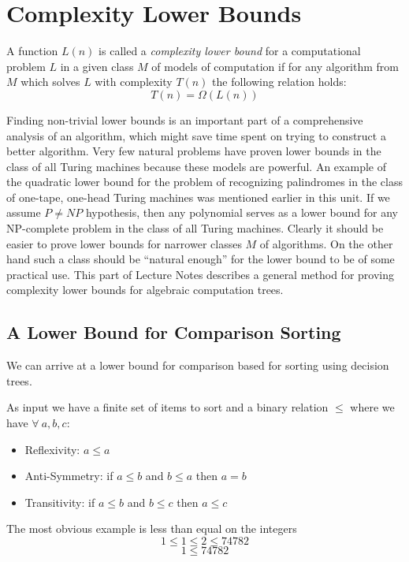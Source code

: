 \section{Complexity Lower Bounds}
\begin{definition}
    A function $L(n)$ is called a \textit{complexity lower bound}
    for a computational problem $L$
    in a given class $M$ of models of computation
    if for any algorithm from $M$ which solves $L$ with complexity $T(n)$ the following relation holds:
    $$T(n) = \Omega(L(n))$$
\end{definition}

Finding non-trivial lower bounds is an important part of a comprehensive analysis of an algorithm,
which might save time spent on trying to construct a better algorithm.
Very few natural problems have proven lower bounds in the class of all Turing machines because these models are powerful.
An example of the quadratic lower bound for the problem of recognizing palindromes in the class of one-tape,
one-head Turing machines was mentioned earlier in this unit.
If we assume $P \neq NP$ hypothesis, then any polynomial serves as a lower bound for any NP-complete problem in the class of all Turing machines.
Clearly it should be easier to prove lower bounds for narrower classes $M$ of algorithms.
On the other hand such a class should be “natural enough” for the lower bound to be of some practical use.
This part of Lecture Notes describes a general method for proving complexity lower bounds for algebraic computation trees.

\subsection{A Lower Bound for Comparison Sorting}
We can arrive at a lower bound for comparison based for sorting using decision trees.

As input we have a finite set of items to sort
and a binary relation $\leq$ where we have $\forall\ a,b,c:$
\begin{itemize}
    \item Reflexivity: $a \leq a$
    \item Anti-Symmetry: if $a \leq b$ and $b \leq a$ then $a = b$
    \item Transitivity: if $a \leq b$ and $b \leq c$ then $a \leq c$
\end{itemize}

\begin{example}
The most obvious example is less than equal on the integers
$$1 \leq 1 \leq 2 \leq 74782$$
$$1 \leq 74782$$
\end{example}

